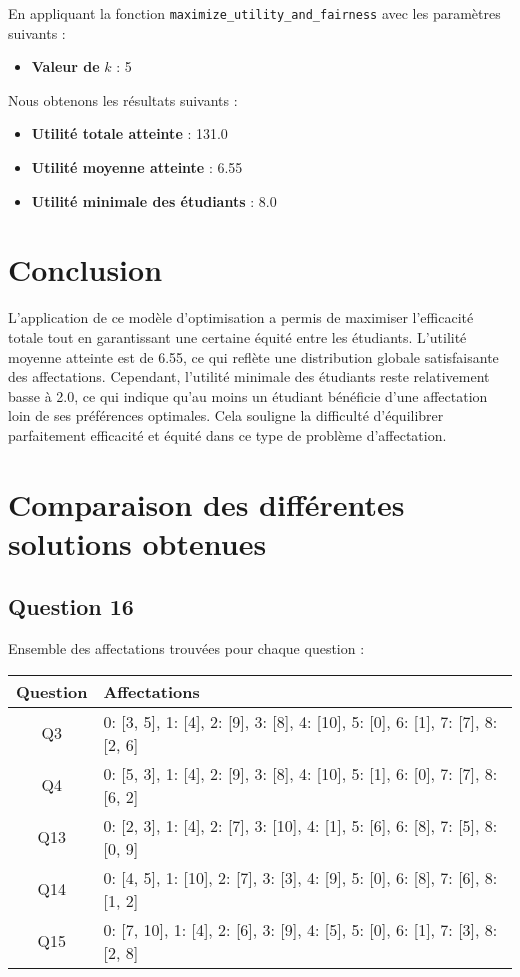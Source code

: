 \documentclass[a4paper,11pt]{article}
\begin{document}
En appliquant la fonction \texttt{maximize\_utility\_and\_fairness} avec les paramètres suivants :

\begin{itemize}
    \item \textbf{Valeur de } $k$ : 5
\end{itemize}

Nous obtenons les résultats suivants :

\begin{itemize}
    \item \textbf{Utilité totale atteinte} : 131.0
    \item \textbf{Utilité moyenne atteinte} : 6.55
    \item \textbf{Utilité minimale des étudiants} : 8.0
\end{itemize}

\section*{Conclusion}

L'application de ce modèle d'optimisation a permis de maximiser l'efficacité totale tout en garantissant une certaine équité entre les étudiants. L'utilité moyenne atteinte est de 6.55, ce qui reflète une distribution globale satisfaisante des affectations. Cependant, l'utilité minimale des étudiants reste relativement basse à 2.0, ce qui indique qu'au moins un étudiant bénéficie d'une affectation loin de ses préférences optimales. Cela souligne la difficulté d'équilibrer parfaitement efficacité et équité dans ce type de problème d'affectation.


\section*{Comparaison des différentes solutions obtenues}

\subsection*{Question 16}

Ensemble des affectations trouvées pour chaque question :

\begin{tabular}{|c|l|}
\hline
Question & Affectations \\
\hline
Q3 & 0: [3, 5], 1: [4], 2: [9], 3: [8], 4: [10], 5: [0], 6: [1], 7: [7], 8: [2, 6] \\
\hline
Q4 & 0: [5, 3], 1: [4], 2: [9], 3: [8], 4: [10], 5: [1], 6: [0], 7: [7], 8: [6, 2] \\
\hline
Q13 & 0: [2, 3], 1: [4], 2: [7], 3: [10], 4: [1], 5: [6], 6: [8], 7: [5], 8: [0, 9] \\
\hline
Q14 & 0: [4, 5], 1: [10], 2: [7], 3: [3], 4: [9], 5: [0], 6: [8], 7: [6], 8: [1, 2] \\
\hline
Q15 & 0: [7, 10], 1: [4], 2: [6], 3: [9], 4: [5], 5: [0], 6: [1], 7: [3], 8: [2, 8] \\
\hline
\end{tabular}
\end{document}
